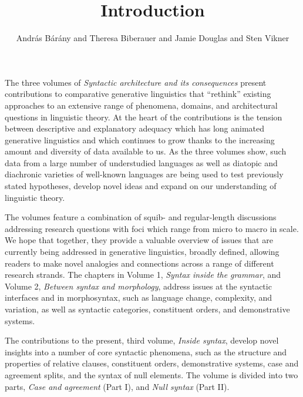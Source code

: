 \documentclass[output=paper]{langsci/langscibook}
\author{András Bárány\affiliation{Bielefeld University} and
        Theresa Biberauer\affiliation{University of Cambridge; Stellenbosch
        University; University of the West Cape} and
        Jamie Douglas\affiliation{University of Cambridge} and
        Sten Vikner\affiliation{Aarhus University}}
\title{Introduction}
\begin{document}
\maketitle

\noindent The three volumes of \emph{Syntactic architecture and its
consequences} present contributions to comparative generative linguistics that
\enquote{rethink} existing approaches to an extensive range of phenomena,
domains, and architectural questions in linguistic theory. At the heart of the
contributions is the tension between descriptive and explanatory adequacy which
has long animated generative linguistics and which continues to grow thanks to
the increasing amount and diversity of data available to us. As the three
volumes show, such data from a large number of understudied languages as well
as diatopic and diachronic varieties of well-known languages are being used to
test previously stated hypotheses, develop novel ideas and expand on our
understanding of linguistic theory.

The volumes feature a combination of squib- and regular-length discussions
addressing research questions with foci which range from micro to macro in
scale. We hope that together, they provide a valuable overview of issues that
are currently being addressed in generative linguistics, broadly defined,
allowing readers to make novel analogies and connections across a range of
different research strands. The chapters in Volume 1, \emph{Syntax inside the
grammar}, and Volume 2, \emph{Between syntax and morphology}, address issues at
the syntactic interfaces and in morphosyntax, such as language change,
complexity, and variation, as well as syntactic categories, constituent orders,
and demonstrative systems.

The contributions to the present, third volume, \emph{Inside syntax}, develop
novel insights into a number of core syntactic phenomena, such as the structure
and properties of relative clauses, constituent orders, demonstrative systems,
case and agreement splits, and the syntax of null elements. The volume is
divided into two parts, \emph{Case and agreement} (Part I), and \emph{Null
syntax} (Part II).
\end{document}
